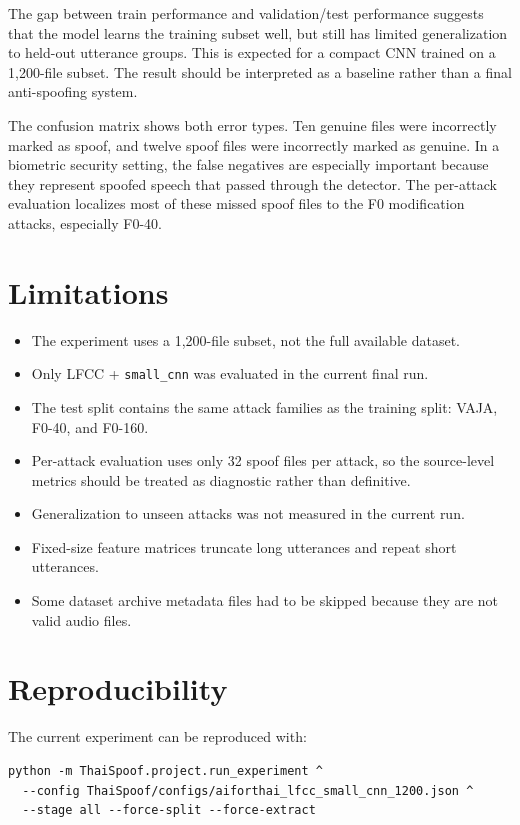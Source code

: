 \documentclass[11pt,a4paper]{article}
\begin{document}
The gap between train performance and validation/test performance suggests that the model learns the training subset well, but still has limited generalization to held-out utterance groups. This is expected for a compact CNN trained on a 1,200-file subset. The result should be interpreted as a baseline rather than a final anti-spoofing system.

The confusion matrix shows both error types. Ten genuine files were incorrectly marked as spoof, and twelve spoof files were incorrectly marked as genuine. In a biometric security setting, the false negatives are especially important because they represent spoofed speech that passed through the detector. The per-attack evaluation localizes most of these missed spoof files to the F0 modification attacks, especially F0-40.

\section{Limitations}

\begin{itemize}
  \item The experiment uses a 1,200-file subset, not the full available dataset.
  \item Only LFCC + \texttt{small\_cnn} was evaluated in the current final run.
  \item The test split contains the same attack families as the training split: VAJA, F0-40, and F0-160.
  \item Per-attack evaluation uses only 32 spoof files per attack, so the source-level metrics should be treated as diagnostic rather than definitive.
  \item Generalization to unseen attacks was not measured in the current run.
  \item Fixed-size feature matrices truncate long utterances and repeat short utterances.
  \item Some dataset archive metadata files had to be skipped because they are not valid audio files.
\end{itemize}

\section{Reproducibility}

The current experiment can be reproduced with:

\begin{verbatim}
python -m ThaiSpoof.project.run_experiment ^
  --config ThaiSpoof/configs/aiforthai_lfcc_small_cnn_1200.json ^
  --stage all --force-split --force-extract
\end{verbatim}
\end{document}
